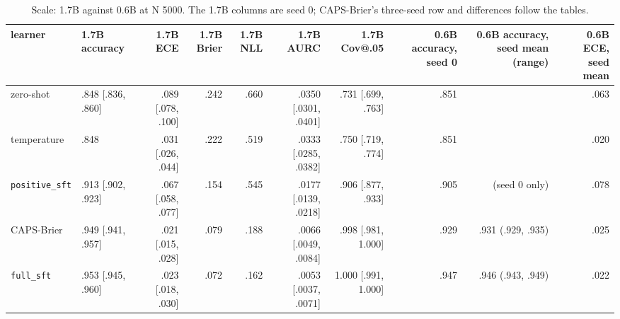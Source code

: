 \documentclass[10pt,letterpaper]{article}
\theoremstyle{plain}
\begin{document}
\begin{table}[H]
\centering
\footnotesize
\setlength{\tabcolsep}{3pt}
\caption{Scale: 1.7B against 0.6B at N 5000. The 1.7B columns are seed 0; CAPS-Brier's three-seed row and differences follow the tables.}
\label{tab:A5}
\begin{adjustbox}{max width=\textwidth}
\begin{tabular}{llrrrrrrrr}
\toprule
learner & 1.7B accuracy & 1.7B ECE & 1.7B Brier & 1.7B NLL & 1.7B AURC & 1.7B Cov@.05 & 0.6B accuracy, seed 0 & 0.6B accuracy, seed mean (range) & 0.6B ECE, seed mean \\
\midrule
zero-shot & .848 [.836, .860] & .089 [.078, .100] & .242 & .660 & .0350 [.0301, .0401] & .731 [.699, .763] & .851 &  & .063 \\
temperature & .848 & .031 [.026, .044] & .222 & .519 & .0333 [.0285, .0382] & .750 [.719, .774] & .851 &  & .020 \\
\texttt{positive\_sft} & .913 [.902, .923] & .067 [.058, .077] & .154 & .545 & .0177 [.0139, .0218] & .906 [.877, .933] & .905 & (seed 0 only) & .078 \\
CAPS-Brier & .949 [.941, .957] & .021 [.015, .028] & .079 & .188 & .0066 [.0049, .0084] & .998 [.981, 1.000] & .929 & .931 (.929, .935) & .025 \\
\texttt{full\_sft} & .953 [.945, .960] & .023 [.018, .030] & .072 & .162 & .0053 [.0037, .0071] & 1.000 [.991, 1.000] & .947 & .946 (.943, .949) & .022 \\
\bottomrule
\end{tabular}
\end{adjustbox}
\end{table}
\end{document}
